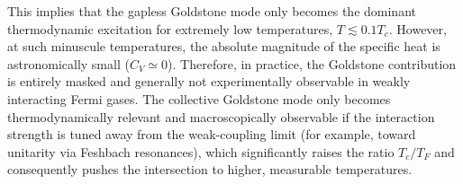 This implies that the gapless Goldstone mode only becomes the dominant thermodynamic excitation for extremely low temperatures, \( T \lesssim 0.1 T_c \). However, at such minuscule temperatures, the absolute magnitude of the specific heat is astronomically small (\( C_V \simeq 0 \)). Therefore, in practice, the Goldstone contribution is entirely masked and generally not experimentally observable in weakly interacting Fermi gases. The collective Goldstone mode only becomes thermodynamically relevant and macroscopically observable if the interaction strength is tuned away from the weak-coupling limit (for example, toward unitarity via Feshbach resonances), which significantly raises the ratio \( T_c/T_F \) and consequently pushes the intersection to higher, measurable temperatures.